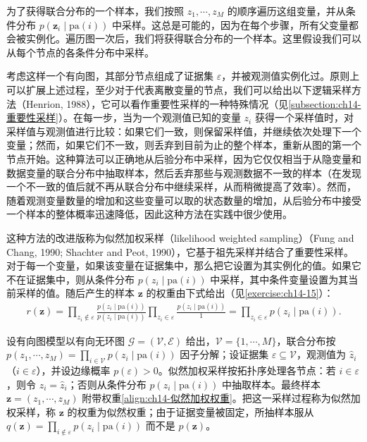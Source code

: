 \documentclass[../../main.tex]{subfiles}
\begin{document}
为了获得联合分布的一个样本，我们按照 $z_{1},\cdots,z_{M}$ 的顺序遍历这组变量，并从条件分布 $p\!\left(\bm{z}_{i}\mid\mathrm{pa}(i)\right)$ 中采样。这总是可能的，因为在每个步骤，所有父变量都会被实例化。遍历图一次后，我们将获得联合分布的一个样本。这里假设我们可以从每个节点的各条件分布中采样。

考虑这样一个有向图，其部分节点组成了证据集 $\varepsilon$，并被观测值实例化过。原则上可以扩展上述过程，至少对于代表离散变量的节点，我们可以给出以下逻辑采样方法（Henrion, 1988），它可以看作重要性采样的一种特殊情况（见\cref{subsection:ch14-重要性采样}）。在每一步，当为一个观测值已知的变量 $z_{i}$ 获得一个采样值时，对采样值与观测值进行比较：如果它们一致，则保留采样值，并继续依次处理下一个变量；然而，如果它们不一致，则丢弃到目前为止的整个样本，重新从图的第一个节点开始。这种算法可以正确地从后验分布中采样，因为它仅仅相当于从隐变量和数据变量的联合分布中抽取样本，然后丢弃那些与观测数据不一致的样本（在发现一个不一致的值后就不再从联合分布中继续采样，从而稍微提高了效率）。然而，随着观测变量数量的增加和这些变量可以取的状态数量的增加，从后验分布中接受一个样本的整体概率迅速降低，因此这种方法在实践中很少使用。

这种方法的改进版称为似然加权采样（likelihood weighted sampling）（Fung and Chang, 1990; Shachter and Peot, 1990），它基于祖先采样并结合了重要性采样。对于每一个变量，如果该变量在证据集中，那么把它设置为其实例化的值。如果它不在证据集中，则从条件分布 $p\!\left(z_{i}\mid\mathrm{pa}(i)\right)$ 中采样，其中条件变量设置为其当前采样的值。随后产生的样本 $\bm{z}$ 的权重由下式给出（见\cref{exercise:ch14-15}）：
\begin{align}
r(\bm{z})=\prod_{z_{i}\notin\varepsilon}\frac{p\!\left(z_{i}\mid\mathrm{pa}(i)\right)}{p\!\left(z_{i}\mid\mathrm{pa}(i)\right)}\prod_{z_{i}\in\varepsilon}\frac{p\!\left(z_{i}\mid\mathrm{pa}(i)\right)}{1}=\prod_{z_{i}\in\varepsilon}p\!\left(z_{i}\mid\mathrm{pa}(i)\right).
\label{align:ch14-似然加权权重}
\end{align}

\begin{definition}[似然加权采样]\label{definition:ch14-似然加权采样}
设有向图模型以有向无环图 $\mathcal{G}=(\mathcal{V},\mathcal{E})$ 给出，$\mathcal{V}=\{1,\cdots,M\}$，联合分布按 $p(z_{1},\cdots,z_{M})=\prod_{i\in\mathcal{V}}p(z_{i}\mid\mathrm{pa}(i))$ 因子分解；设证据集 $\varepsilon\subseteq\mathcal{V}$，观测值为 $\hat{z}_{i}$（$i\in\varepsilon$），并设边缘概率 $p(\varepsilon)>0$。似然加权采样按拓扑序处理各节点：若 $i\in\varepsilon$，则令 $z_{i}=\hat{z}_{i}$；否则从条件分布 $p(z_{i}\mid\mathrm{pa}(i))$ 中抽取样本。最终样本 $\bm{z}=(z_{1},\cdots,z_{M})$ 附带权重\eqref{align:ch14-似然加权权重}。把这一采样过程称为似然加权采样，称 $\bm{z}$ 的权重为似然权重；由于证据变量被固定，所抽样本服从 $q(\bm{z})=\prod_{i\notin\varepsilon}p(z_{i}\mid\mathrm{pa}(i))$ 而不是 $p(\bm{z})$。
\end{definition}
\end{document}
